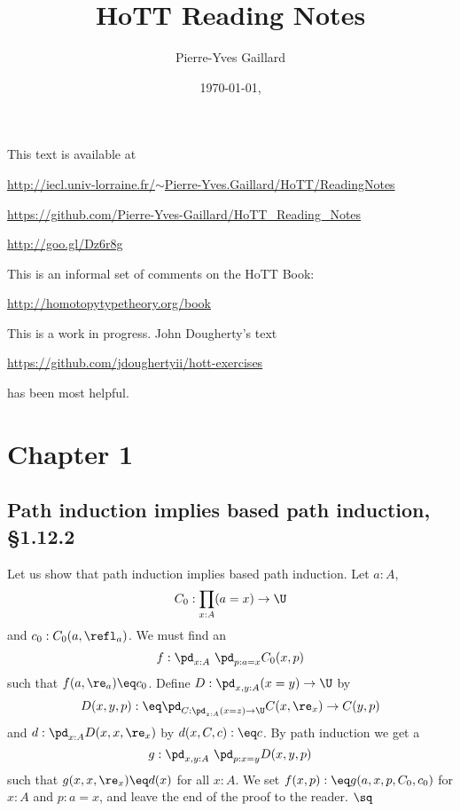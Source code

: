 \documentclass[12pt]{article}
\title{HoTT Reading Notes}
\author{Pierre-Yves Gaillard}
\date{\today, \currenttime}
\begin{document}

\maketitle%

\nn This text is available at 

\nn\href{http://iecl.univ-lorraine.fr/~Pierre-Yves.Gaillard/HoTT/ReadingNotes}{http://iecl.univ-lorraine.fr/$\sim$Pierre-Yves.Gaillard/HoTT/ReadingNotes}


\nn\href{https://github.com/Pierre-Yves-Gaillard/HoTT_Reading_Notes}{https://github.com/Pierre-Yves-Gaillard/HoTT\_Reading\_Notes}

\nn\href{http://goo.gl/Dz6r8g}{http://goo.gl/Dz6r8g}

This is an informal set of comments on the HoTT Book:

\nn\href{http://homotopytypetheory.org/book}{http://homotopytypetheory.org/book}

This is a work in progress. John Dougherty's text 

\nn\href{https://github.com/jdoughertyii/hott-exercises}{https://github.com/jdoughertyii/hott-exercises}

\nn has been most helpful.

\tableofcontents%


\section{Chapter 1}

\subsection{Path induction implies based path induction, \S1.12.2}%

Let us show that path induction implies based path induction. Let $a:A$, 
$$
C_0:\prod_{x:A}(a=x)\to\U
$$ 
and $c_0:C_0(a,\refl_a)$. We must find an 
$$
f:\pd_{x:A}\ \pd_{p:a=x}C_0(x,p)
$$ 
such that $f(a,\re_a)\eq c_0$. Define $D:\pd_{x,y:A}(x=y)\to\U$ by 
$$
D(x,y,p):\eq\pd_{C:\pd_{z:A}(x=z)\to\U}C(x,\re_x)\to C(y,p)
$$ 
and $d:\pd_{x:A}D(x,x,\re_x)$ by $d(x,C,c):\eq c$. By path induction we get a 
$$
g:\pd_{x,y:A}\ \pd_{p:x=y}D(x,y,p)
$$ 
such that $g(x,x,\re_x)\eq d(x)$ for all $x:A$. We set $f(x,p):\eq g(a,x,p,C_0,c_0)$ for $x:A$ and $p:a=x$, and leave the end of the proof to the reader. $\sq$
\end{document}
